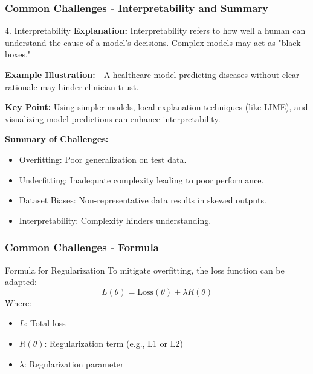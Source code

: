 \documentclass{beamer}
\begin{document}
\begin{frame}[fragile]
    \frametitle{Common Challenges - Interpretability and Summary}
    \begin{block}{4. Interpretability}
        \textbf{Explanation:}  
        Interpretability refers to how well a human can understand the cause of a model's decisions. Complex models may act as "black boxes."
    \end{block}

    \textbf{Example Illustration:}  
    - A healthcare model predicting diseases without clear rationale may hinder clinician trust.

    \textbf{Key Point:}  
    Using simpler models, local explanation techniques (like LIME), and visualizing model predictions can enhance interpretability.
    
    \vspace{0.2cm}
    \textbf{Summary of Challenges:}
    \begin{itemize}
        \item Overfitting: Poor generalization on test data.
        \item Underfitting: Inadequate complexity leading to poor performance.
        \item Dataset Biases: Non-representative data results in skewed outputs.
        \item Interpretability: Complexity hinders understanding.
    \end{itemize}
\end{frame}

\begin{frame}[fragile]
    \frametitle{Common Challenges - Formula}
    \begin{block}{Formula for Regularization}
        To mitigate overfitting, the loss function can be adapted:
        \begin{equation}
        L(\theta) = \text{Loss}(\theta) + \lambda R(\theta)
        \end{equation}
        Where:
        \begin{itemize}
            \item \( L \): Total loss
            \item \( R(\theta) \): Regularization term (e.g., L1 or L2)
            \item \( \lambda \): Regularization parameter
        \end{itemize}
    \end{block}
\end{frame}
\end{document}
